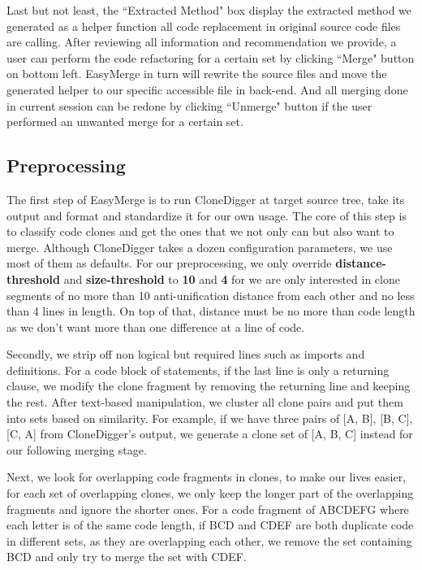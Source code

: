 \documentclass{acm_proc_article-sp}
\begin{document}
Last but not least, the ``Extracted Method" box display the extracted method we generated as a helper function all code replacement 
in original source code files are calling. After reviewing all information and recommendation we provide, a user can perform the code refactoring for
a certain set by clicking ``Merge" button on bottom left. 
EasyMerge in turn will rewrite the source files and move the generated helper to our specific accessible file in back-end.
And all merging done in current session can be redone by clicking ``Unmerge" button if
the user performed an unwanted merge for a certain set.

\subsection{Preprocessing}
The first step of EasyMerge is to run CloneDigger at target source tree, take its output and format and standardize it for our own usage.
The core of this step is to classify code clones and get the ones that we not only can but also want to merge. Although CloneDigger takes
a dozen configuration parameters, we use most of them as defaults. For our preprocessing, we only override {\bf distance-threshold} and {\bf size-threshold}
to {\bf 10} and {\bf 4} for we are only interested in clone segments of no more than 10 anti-unification distance from each other and no less than 4 lines in length.
On top of that, distance must be no more than code length as we don't want more than one difference at a line of code.

Secondly, we strip off non logical but required lines such as imports and definitions. For a code block of statements, if the last line is only a returning clause, we
modify the clone fragment by removing the returning line and keeping the rest. After text-based manipulation, we cluster all clone pairs and put them into sets
based on similarity. For example, if we have three pairs of [A, B], [B, C], [C, A] from CloneDigger's output, we generate a clone set
of [A, B, C] instead for our following merging stage.

Next, we look for overlapping code fragments in clones, to make our lives easier, for each set of overlapping clones, we only keep the longer part of the overlapping fragments
and ignore the shorter ones. For a code fragment of ABCDEFG where each letter is of the same code length, if BCD and CDEF are both duplicate code in different sets,
as they are overlapping each other,
we remove the set containing BCD and only try to merge the set with CDEF.
\end{document}
